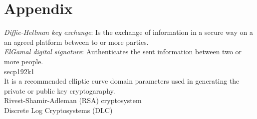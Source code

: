 \section{Appendix}
\textit{Diffie-Hellman key exchange}: Is the exchange of information in a secure way on a an agreed platform between to or more parties.\\
\textit{ElGamal digital signature}: Authenticates the sent information between two or more people.\\
secp192k1\\  It is a recommended elliptic curve domain parameters used in generating the private or public key cryptogaraphy.\\
Rivest-Shamir-Adleman (RSA) cryptosystem\\
Discrete Log Cryptosystems (DLC)\\

